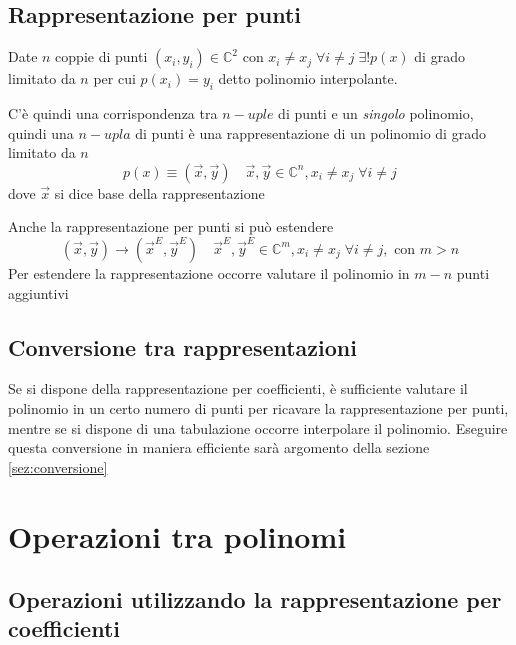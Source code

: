 \subsection{Rappresentazione per punti}
\begin{theorem}
    Date $n$ coppie di punti $\left( x_i, y_i \right) \in \mathbb{C}^2 \text{ con }
    x_i \neq x_j
    \; \forall i \neq j
    \; \exists ! p(x)
    $
    di grado limitato da $n$ per cui
    $p(x_i) = y_i$
    detto polinomio interpolante.
    \label{teo:interpolazione}
\end{theorem}
C'è quindi una corrispondenza tra $n-uple$ di punti e un \emph{singolo} polinomio, quindi una $n-upla$ di punti è una rappresentazione di un polinomio di grado limitato da $n$
\begin{equation*}
    p(x) \equiv \left( \vec{x}, \vec{y}\right) \quad
    \vec{x}, \vec{y} \in \mathbb{C}^{n}, x_i \neq x_j \; \forall i \neq j
\end{equation*}
dove $\vec{x}$ si dice base della rappresentazione

Anche la rappresentazione per punti si può estendere
\begin{equation*}
    \left( \vec{x}, \vec{y}\right) \rightarrow
    \left( \vec{x}^E, \vec{y}^E\right) \quad
    \vec{x}^E, \vec{y}^E \in \mathbb{C}^{m}, x_i \neq x_j \; \forall i \neq j, \text{ con } m>n
\end{equation*}
Per estendere la rappresentazione occorre valutare il polinomio in $m-n$ punti aggiuntivi

\subsection{Conversione tra rappresentazioni}
Se si dispone della rappresentazione per coefficienti, è sufficiente valutare il polinomio in un certo numero di punti per ricavare la rappresentazione per punti, mentre se si dispone di una tabulazione occorre interpolare il polinomio. Eseguire questa conversione in maniera efficiente sarà argomento della sezione \ref{sez:conversione}

\section{Operazioni tra polinomi}

\subsection{Operazioni utilizzando la rappresentazione per coefficienti}
